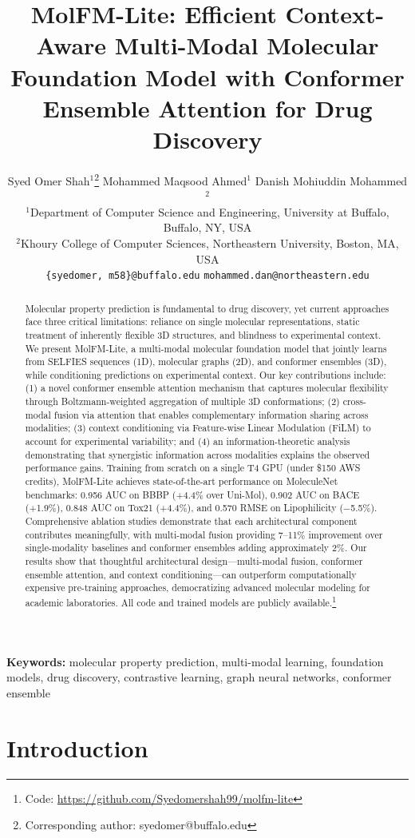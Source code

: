 \documentclass[11pt]{article}
\title{\textbf{MolFM-Lite: Efficient Context-Aware Multi-Modal Molecular Foundation Model with Conformer Ensemble Attention for Drug Discovery}}
\author{
Syed Omer Shah$^{1}$\thanks{Corresponding author: syedomer@buffalo.edu} \quad
Mohammed Maqsood Ahmed$^{1}$ \quad
Danish Mohiuddin Mohammed$^{2}$ \\[0.5em]
$^{1}$Department of Computer Science and Engineering, University at Buffalo, Buffalo, NY, USA \\
$^{2}$Khoury College of Computer Sciences, Northeastern University, Boston, MA, USA \\[0.3em]
\texttt{\{syedomer, m58\}@buffalo.edu} \quad \texttt{mohammed.dan@northeastern.edu}
}
\date{}
\newcommand{\modelname}{MolFM-Lite}
\begin{document}
\maketitle

\begin{abstract}
Molecular property prediction is fundamental to drug discovery, yet current approaches face three critical limitations: reliance on single molecular representations, static treatment of inherently flexible 3D structures, and blindness to experimental context. We present \modelname{}, a multi-modal molecular foundation model that jointly learns from SELFIES sequences (1D), molecular graphs (2D), and conformer ensembles (3D), while conditioning predictions on experimental context. Our key contributions include: (1) a novel conformer ensemble attention mechanism that captures molecular flexibility through Boltzmann-weighted aggregation of multiple 3D conformations; (2) cross-modal fusion via attention that enables complementary information sharing across modalities; (3) context conditioning via Feature-wise Linear Modulation (FiLM) to account for experimental variability; and (4) an information-theoretic analysis demonstrating that synergistic information across modalities explains the observed performance gains. Training from scratch on a single T4 GPU (under \$150 AWS credits), \modelname{} achieves state-of-the-art performance on MoleculeNet benchmarks: 0.956 AUC on BBBP (+4.4\% over Uni-Mol), 0.902 AUC on BACE (+1.9\%), 0.848 AUC on Tox21 (+4.4\%), and 0.570 RMSE on Lipophilicity ($-$5.5\%). Comprehensive ablation studies demonstrate that each architectural component contributes meaningfully, with multi-modal fusion providing 7--11\% improvement over single-modality baselines and conformer ensembles adding approximately 2\%. Our results show that thoughtful architectural design---multi-modal fusion, conformer ensemble attention, and context conditioning---can outperform computationally expensive pre-training approaches, democratizing advanced molecular modeling for academic laboratories. All code and trained models are publicly available.\footnote{Code: \url{https://github.com/Syedomershah99/molfm-lite}}
\end{abstract}

\textbf{Keywords:} molecular property prediction, multi-modal learning, foundation models, drug discovery, contrastive learning, graph neural networks, conformer ensemble

\section{Introduction}
\label{sec:introduction}
\end{document}
